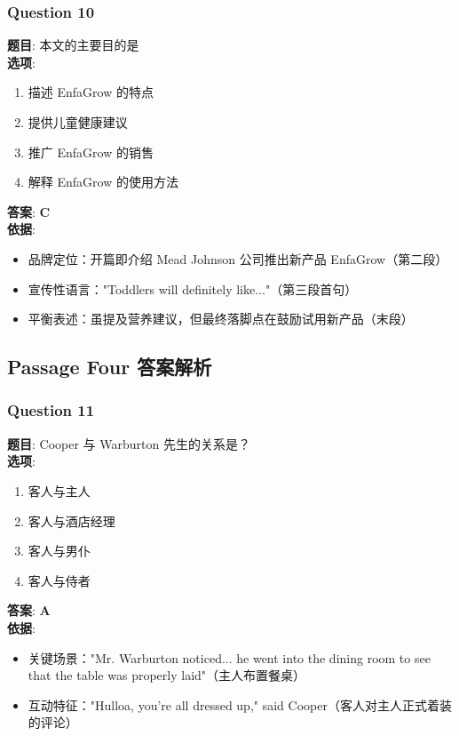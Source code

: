 \documentclass{article}
\begin{document}
\subsubsection*{Question 10}
\textbf{题目}: 本文的主要目的是 \\
\textbf{选项}: 
\begin{enumerate}[label=\Alph*)]
    \item 描述 EnfaGrow 的特点
    \item 提供儿童健康建议
    \item 推广 EnfaGrow 的销售
    \item 解释 EnfaGrow 的使用方法
\end{enumerate}
\textbf{答案}: \textbf{C} \\
\textbf{依据}:
\begin{itemize}
    \item 品牌定位：开篇即介绍 Mead Johnson 公司推出新产品 EnfaGrow（第二段）
    \item 宣传性语言："Toddlers will definitely like..."（第三段首句）
    \item 平衡表述：虽提及营养建议，但最终落脚点在鼓励试用新产品（末段）
\end{itemize}

\subsection*{Passage Four 答案解析}

\subsubsection*{Question 11}
\textbf{题目}: Cooper 与 Warburton 先生的关系是？ \\
\textbf{选项}: 
\begin{enumerate}[label=\Alph*)]
    \item 客人与主人
    \item 客人与酒店经理
    \item 客人与男仆
    \item 客人与侍者
\end{enumerate}
\textbf{答案}: \textbf{A} \\
\textbf{依据}:
\begin{itemize}
    \item 关键场景："Mr. Warburton noticed... he went into the dining room to see that the table was properly laid"（主人布置餐桌）
    \item 互动特征："Hulloa, you're all dressed up," said Cooper（客人对主人正式着装的评论）
\end{itemize}
\end{document}
